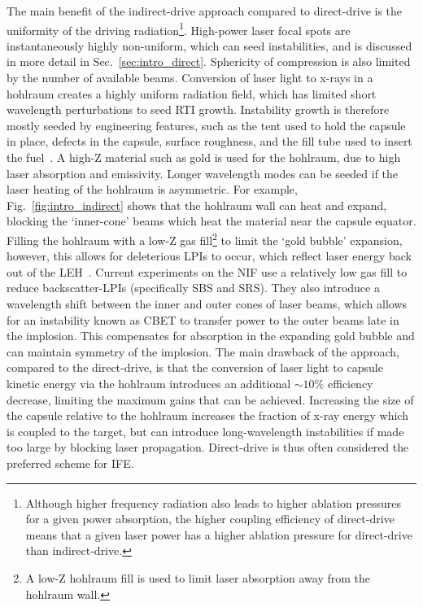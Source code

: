 The main benefit of the indirect-drive approach compared to direct-drive is the uniformity of the driving radiation\footnote{Although higher frequency radiation also leads to higher ablation pressures for a given power absorption, the higher coupling efficiency of direct-drive means that a given laser power has a higher ablation pressure for direct-drive than indirect-drive.}.
High-power laser focal spots are instantaneously highly non-uniform, which can seed instabilities, and is discussed in more detail in Sec.~\ref{sec:intro_direct}. 
Sphericity of compression is also limited by the number of available beams.
Conversion of laser light to x-rays in a hohlraum creates a highly uniform radiation field, which has limited short wavelength perturbations to seed \ac{RTI} growth.
Instability growth is therefore mostly seeded by engineering features, such as the tent used to hold the capsule in place, defects in the capsule, surface roughness, and the fill tube used to insert the fuel~\cite{clark_threedimensional_2016}.
A high-Z material such as gold is used for the hohlraum, due to high laser absorption and emissivity.
Longer wavelength modes can be seeded if the laser heating of the hohlraum is asymmetric.
For example, Fig.~\ref{fig:intro_indirect} shows that the hohlraum wall can heat and expand, blocking the `inner-cone' beams which heat the material near the capsule equator.
Filling the hohlraum with a low-Z gas fill\footnote{A low-Z hohlraum fill is used to limit laser absorption away from the hohlraum wall.} to limit the `gold bubble' expansion, however, this allows for deleterious \ac{LPIs} to occur, which reflect laser energy back out of the \ac{LEH}~\cite{macgowan_laser_1996}.
Current experiments on the \ac{NIF} use a relatively low gas fill to reduce backscatter-\ac{LPIs} (specifically \ac{SBS} and \ac{SRS}).
They also introduce a wavelength shift between the inner and outer cones of laser beams, which allows for an instability known as \ac{CBET} to transfer power to the outer beams late in the implosion\cite{michel_tuning_2009,moody_multistep_2012,kritcher_energy_2018}.
This compensates for absorption in the expanding gold bubble and can maintain symmetry of the implosion.
The main drawback of the approach, compared to the direct-drive, is that the conversion of laser light to capsule kinetic energy via the hohlraum introduces an additional $\sim10\%$ efficiency decrease, limiting the maximum gains that can be achieved.
Increasing the size of the capsule relative to the hohlraum increases the fraction of x-ray energy which is coupled to the target, but can introduce long-wavelength instabilities if made too large by blocking laser propagation.
Direct-drive is thus often considered the preferred scheme for \ac{IFE}.


